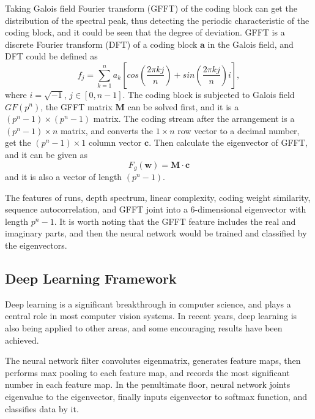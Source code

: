 \documentclass[conference]{IEEEtran}
\begin{document}
Taking Galois field Fourier transform (GFFT) \cite{lin2020scheme} of the coding block can get the distribution of the spectral peak, thus detecting the periodic characteristic of the coding block, and it could be seen that the degree of deviation. GFFT is a discrete Fourier transform (DFT) \cite{chen2019new} of a coding block $\boldsymbol{a}$ in the Galois field, and DFT could be defined as
\begin{equation}
	f_j = \sum_{k = 1}^{n} a_k \left[cos\left(\frac {2\pi kj} n\right) + sin\left(\frac {2\pi kj} n\right)i \right],
\end{equation}
where $i = \sqrt{-1}$, $j \in [0, n - 1]$. The coding block is subjected to Galois field $GF(p^n)$, the GFFT matrix $\boldsymbol{M}$ can be solved first, and it is a $(p^n - 1) \times (p^n - 1)$ matrix. The coding stream after the arrangement is a $(p^n - 1) \times n$ matrix, and converts the $1 \times n$ row vector to a decimal number, get the $(p^n - 1) \times 1$ column vector $\boldsymbol{c}$. Then calculate the eigenvector of GFFT, and it can be given as
\begin{equation}
	F_g(\boldsymbol{w}) = \boldsymbol{M} \cdot \boldsymbol{c}
\end{equation}
and it is also a vector of length $(p^n - 1)$.

The features of runs, depth spectrum, linear complexity, coding weight similarity, sequence autocorrelation, and GFFT joint into a 6-dimensional eigenvector with length $p^n - 1$. It is worth noting that the GFFT feature includes the real and imaginary parts, and then the neural network would be trained and classified by the eigenvectors.


\subsection{Deep Learning Framework}
Deep learning \cite{liao2021statistical} is a significant breakthrough in computer science, and plays a central role in most computer vision systems. In recent years, deep learning is also being applied to other areas, and some encouraging results have been achieved. 

The neural network filter convolutes eigenmatrix, generates feature maps, then performs max pooling to each feature map, and records the most significant number in each feature map. In the penultimate floor, neural network joints eigenvalue to the eigenvector, finally inputs eigenvector to softmax function, and classifies data by it.
\end{document}
